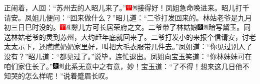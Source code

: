 正闹着，人回：``苏州去的人昭儿来了。''{\includegraphics[width=3mm]{../Images/00002}\includegraphics[width=3mm]{../Images/00011}\footnotesize \kaishu 接得好！}凤姐急命唤进来。昭儿打千请安。凤姐儿便问：``回来做什么？''昭儿道：``二爷打发回来的。林姑老爷是九月初三日巳时没的。{\includegraphics[width=3mm]{../Images/00002}\includegraphics[width=3mm]{../Images/00010}\footnotesize \kaishu 颦儿方可长居荣府之文。}二爷带了林姑娘{\includegraphics[width=3mm]{../Images/00004}\includegraphics[width=3mm]{../Images/00011}\footnotesize \kaishu 暗写黛玉。}同送林姑老爷的灵到苏州，大约赶年底就回来了。二爷打发小的来报个信请安，讨老太太示下，还瞧瞧奶奶家里好，叫把大毛衣服带几件去。''凤姐道：``你见过别人了没有？''昭儿道：``都见过了。''说毕，连忙退出。凤姐向宝玉笑道：``你林妹妹可在咱们家住长了。''{\includegraphics[width=3mm]{../Images/00004}\includegraphics[width=3mm]{../Images/00011}\footnotesize \kaishu 此系无意中之有意，妙！}宝玉道：``了不得！想来这几日他不知哭的怎么样呢！''说着蹙眉长叹。

